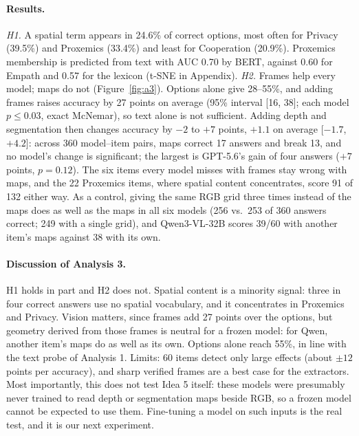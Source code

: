 \paragraph{Results.} \emph{H1.} A spatial term appears in 24.6\% of correct options, most often for Privacy (39.5\%) and Proxemics (33.4\%) and least for Cooperation (20.9\%). Proxemics membership is predicted from text with AUC 0.70 by BERT, against 0.60 for Empath and 0.57 for the lexicon (t-SNE in Appendix). \emph{H2.} Frames help every model; maps do not (Figure~\ref{fig:a3}). Options alone give 28--55\%, and adding frames raises accuracy by 27 points on average (95\% interval [16, 38]; each model $p\le0.03$, exact McNemar), so text alone is not sufficient. Adding depth and segmentation then changes accuracy by $-2$ to $+7$ points, $+1.1$ on average [$-1.7$, $+4.2$]: across 360 model--item pairs, maps correct 17 answers and break 13, and no model's change is significant; the largest is GPT-5.6's gain of four answers ($+7$ points, $p=0.12$). The six items every model misses with frames stay wrong with maps, and the 22 Proxemics items, where spatial content concentrates, score 91 of 132 either way. As a control, giving the same RGB grid three times instead of the maps does as well as the maps in all six models (256 vs.\ 253 of 360 answers correct; 249 with a single grid), and Qwen3-VL-32B scores 39/60 with another item's maps against 38 with its own.

\paragraph{Discussion of Analysis 3.} H1 holds in part and H2 does not. Spatial content is a minority signal: three in four correct answers use no spatial vocabulary, and it concentrates in Proxemics and Privacy. Vision matters, since frames add 27 points over the options, but geometry derived from those frames is neutral for a frozen model: for Qwen, another item's maps do as well as its own. Options alone reach 55\%, in line with the text probe of Analysis 1. Limits: 60 items detect only large effects (about $\pm12$ points per accuracy), and sharp verified frames are a best case for the extractors. Most importantly, this does not test Idea 5 itself: these models were presumably never trained to read depth or segmentation maps beside RGB, so a frozen model cannot be expected to use them. Fine-tuning a model on such inputs is the real test, and it is our next experiment.
